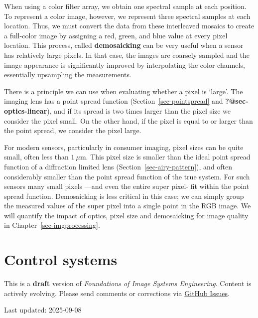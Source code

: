 \documentclass[
  letterpaper,
]{book}
\begin{document}
When using a color filter array, we obtain one spectral sample at each
position. To represent a color image, however, we represent three
spectral samples at each location. Thus, we must convert the data from
these interleaved mosaics to create a full-color image by assigning a
red, green, and blue value at every pixel location. This process, called
\textbf{demosaicking} can be very useful when a sensor has relatively
large pixels. In that case, the images are coarsely sampled and the
image appearance is significantly improved by interpolating the color
channels, essentially upsampling the measurements.

There is a principle we can use when evaluating whether a pixel is
`large'. The imaging lens has a point spread function
(Section~\ref{sec-pointspread} and \textbf{?@sec-optics-linear}), and if
its spread is two times larger than the pixel size we consider the pixel
small. On the other hand, if the pixel is equal to or larger than the
point spread, we consider the pixel large.

For modern sensors, particularly in consumer imaging, pixel sizes can be
quite small, often less than \(1~\mu \text{m}\). This pixel size is
smaller than the ideal point spread function of a diffraction limited
lens (Section~\ref{sec-airy-pattern}), and often considerably smaller
than the point spread function of the true system. For such sensors many
small pixels ---and even the entire super pixel- fit within the point
spread function. Demosaicking is less critical in this case; we can
simply group the measured values of the super pixel into a single point
in the RGB image. We will quantify the impact of optics, pixel size and
demosaicking for image quality in Chapter~\ref{sec-imgprocessing}.

\chapter{Control systems}\label{sec-sensor-control}

\begin{tcolorbox}[enhanced jigsaw, opacityback=0, breakable, coltitle=black, leftrule=.75mm, left=2mm, colframe=quarto-callout-warning-color-frame, opacitybacktitle=0.6, bottomtitle=1mm, bottomrule=.15mm, toprule=.15mm, title=\textcolor{quarto-callout-warning-color}{\faExclamationTriangle}\hspace{0.5em}{Work in Progress}, titlerule=0mm, toptitle=1mm, colback=white, rightrule=.15mm, colbacktitle=quarto-callout-warning-color!10!white, arc=.35mm]

This is a \textbf{draft} version of \emph{Foundations of Image Systems
Engineering}. Content is actively evolving. Please send comments or
corrections via \href{https://github.com/wandell/FISE-git/issues}{GitHub
Issues}.

Last updated: 2025-09-08

\end{tcolorbox}
\end{document}
